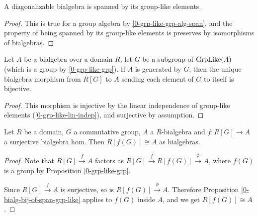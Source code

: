 \begin{lemma}
  \label{0-is-diag-bialg-group-like-span}
  \leanok

  A diagonalizable bialgebra is spanned by its group-like elements.
\end{lemma}
\begin{proof}
  \leanok

  This is true for a group algebra by \ref{0-grp-like-grp-alg-span}, and the
  property of being spanned by its group-like elements is preserves by
  isomorphisms of bialgebras.
\end{proof}


\begin{proposition}
  \label{0-bialg-bij-of-span-grp-like}

  Let $A$ be a bialgebra over a domain $R$,
  let $G$ be a subgroup of $\operatorname{GrpLike}(A)$ (which is a group by \ref{0-grp-like-grp}).
  If $A$ is generated by $G$,
  then the unique bialgebra morphism from $R[G]$ to $A$
  sending each element of $G$ to itself is bijective.
\end{proposition}
\begin{proof}
  \leanok

  This morphism is injective by the linear independence of group-like elements
  (\ref{0-grp-like-lin-indep}), and surjective by assumption.
\end{proof}


\begin{proposition}
  \label{0-is-diag-bialg-quot}

  Let $R$ be a domain, $G$ a commutative group,
  $A$ a $R$-bialgebra and $f : R[G] \to A$ a surjective bialgebra hom.
  Then $R[f(G)] \cong A$ as bialgebras.
\end{proposition}
\begin{proof}

  Note that $R[G] \xrightarrow f A$ factors as $R[G] \xrightarrow f R[f(G)] \xrightarrow\phi A$,
  where $f(G)$ is a group by Proposition \ref{0-grp-like-grp}.

  Since $R[G] \xrightarrow f A$ is surjective, so is $R[f(G)] \xrightarrow\phi A$.
  Therefore Proposition \ref{0-bialg-bij-of-span-grp-like} applies to $f(G)$ inside $A$,
  and we get $R[f(G)] \cong A$.
\end{proof}


